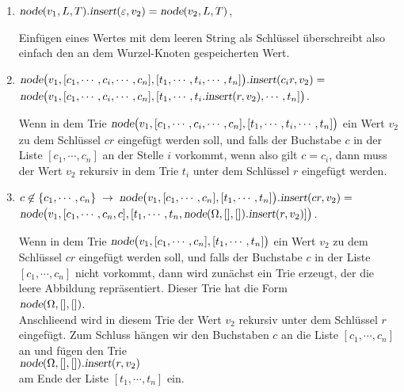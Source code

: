 \begin{enumerate}
\item $\textsl{node}(v_1,L,T).\textsl{insert}(\varepsilon, v_2) = \textsl{node}(v_2,L,T)$,

      Einf\"ugen eines Wertes mit dem leeren String als Schl\"ussel \"uberschreibt also einfach
      den an dem Wurzel-Knoten gespeicherten Wert. 
\item $\textsl{node}\bigl(v_1,[c_1,\cdots,c_i,\cdots,c_n], [t_1,\cdots,t_i,\cdots,t_n]\bigr).\textsl{insert}(c_ir,v_2) =$ \\[0.2cm]
      \hspace*{1.3cm}  
      $\textsl{node}\bigl(v_1,[c_1,\cdots,c_i,\cdots,c_n], [t_1,\cdots,t_i.\textsl{insert}(r,v_2),\cdots,t_n]\bigr)$.

      Wenn in dem Trie $\textsl{node}\bigl(v_1,[c_1,\cdots,c_i,\cdots,c_n], [t_1,\cdots,t_i,\cdots,t_n]\bigr)$ ein Wert
      $v_2$ zu dem Schl\"ussel $cr$ eingef\"ugt werden soll, und falls der Buchstabe $c$ in der Liste $[c_1,\cdots,c_n]$
      an der Stelle $i$ vorkommt, wenn also gilt $c= c_i$, dann muss der Wert $v_2$
      rekursiv in dem Trie $t_i$ unter dem Schl\"ussel 
      $r$ eingef\"ugt werden.

\item $c \not\in\{c_1,\cdots,c_n\} \;\rightarrow\;\textsl{node}\bigl(v_1,[c_1,\cdots,c_n], [t_1,\cdots,t_n]\bigr).\textsl{insert}(cr,v_2) =$ \\[0.2cm]
      \hspace*{1.3cm}  
      $\textsl{node}\bigl(v_1,[c_1,\cdots,c_n,c], [t_1,\cdots,t_n,\textsl{node}(\Omega,[],[]).\textsl{insert}(r,v_2)]\bigr)$.
      
      Wenn in dem Trie $\textsl{node}\bigl(v_1,[c_1,\cdots,c_n], [t_1,\cdots,t_n]\bigr)$
      ein Wert $v_2$ zu dem Schl\"ussel $cr$ eingef\"ugt werden soll, und falls der Buchstabe
      $c$ in der Liste $[c_1,\cdots,c_n]$ nicht vorkommt, dann wird zun\"achst ein Trie
      erzeugt, der die leere Abbildung repr\"asentiert.  Dieser Trie hat die Form \\[0.2cm]
      \hspace*{1.3cm} $\textsl{node}(\Omega, [], [])$. \\[0.2cm]
      Anschlie\3end wird in diesem Trie der Wert $v_2$ rekursiv unter dem Schl\"ussel $r$
      eingef\"ugt. Zum Schluss h\"angen wir den Buchstaben $c$ an die Liste $[c_1,\cdots,c_n]$
      an und f\"ugen den Trie  \\[0.2cm] 
      \hspace*{1.3cm} $\textsl{node}(\Omega, [], []).\textsl{insert}(r,v_2)$ \\[0.2cm]
      am Ende der Liste $[t_1,\cdots,t_n]$ ein.
\end{enumerate}

